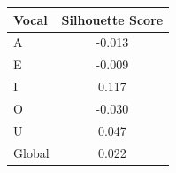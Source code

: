 \begin{tabular}{lc}
\toprule
\rowcolor{col01}
Vocal & Silhouette Score \\
\midrule
A & -0.013 \\
E & -0.009 \\
I & 0.117 \\
O & -0.030 \\
U & 0.047 \\
Global & 0.022 \\
\bottomrule
\end{tabular}
